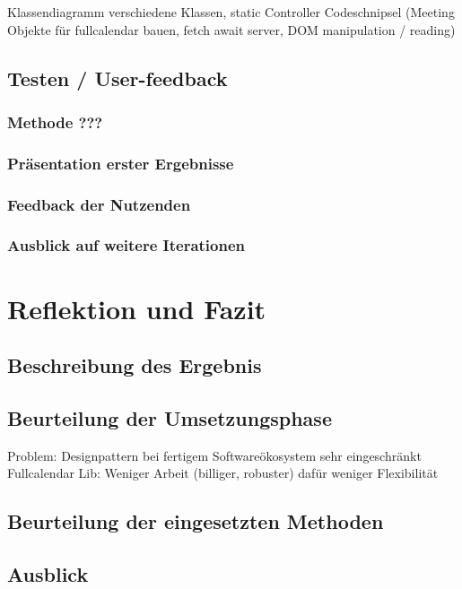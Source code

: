 \documentclass[12pt]{article}
\begin{document}
Klassendiagramm verschiedene Klassen, static Controller Codeschnipsel (Meeting
Objekte für fullcalendar bauen, fetch await server, DOM manipulation / reading)

\subsection{Testen / User-feedback}
\subsubsection{Methode ???}
\subsubsection{Präsentation erster Ergebnisse}
\subsubsection{Feedback der Nutzenden}
\subsubsection{Ausblick auf weitere Iterationen}

\section{Reflektion und Fazit}
\subsection{Beschreibung des Ergebnis}
\subsection{Beurteilung der Umsetzungsphase}
Problem: Designpattern bei fertigem Softwareökosystem sehr eingeschränkt
Fullcalendar Lib: Weniger Arbeit (billiger, robuster) dafür weniger
Flexibilität

\subsection{Beurteilung der eingesetzten Methoden}

\subsection{Ausblick}

\newpage



\end{document}

